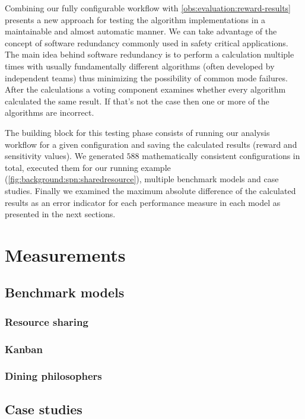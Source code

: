 Combining our fully configurable workflow with \cref{obs:evaluation:reward-results} presents a new approach for testing the algorithm implementations in a maintainable and almost automatic manner. We can take advantage of the concept of software redundancy commonly used in safety critical applications. The main idea behind software redundancy is to perform a calculation multiple times with usually fundamentally different algorithms (often developed by independent teams) thus minimizing the possibility of common mode failures. After the calculations a voting component examines whether every algorithm calculated the same result. If that's not the case then one or more of the algorithms are incorrect.

The building block for this testing phase consists of running our analysis workflow for a given configuration and saving the calculated results (reward and sensitivity values). We generated $588$ mathematically consistent configurations in total, executed them for our running example (\cref{fig:background:spn:sharedresource}), multiple benchmark models and case studies. Finally we examined the maximum absolute difference of the calculated results as an error indicator for each performance measure in each model as presented in the next sections.

\section{Measurements}

\subsection{Benchmark models}

\subsubsection{Resource sharing}

\subsubsection{Kanban}

\subsubsection{Dining philosophers}

\subsection{Case studies}

